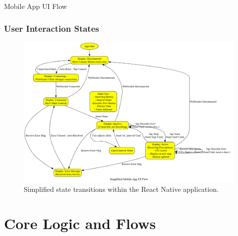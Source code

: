 \documentclass{beamer}
\begin{document}
\begin{frame}{Mobile App UI Flow}
    \frametitle{User Interaction States}
     \begin{figure}
        \centering
        \includegraphics[height=0.75\textheight, width=\textwidth, keepaspectratio]{Mobile_App_UI_Flow_Diagram.png} %
        \caption{Simplified state transitions within the React Native application.}
    \end{figure}
\end{frame}

\section{Core Logic and Flows}
\end{document}
